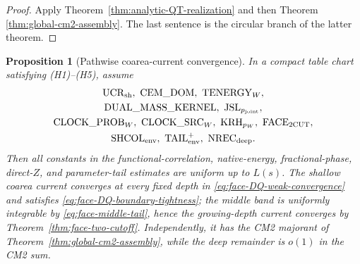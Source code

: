 \documentclass[11pt]{article}
\newtheorem{proposition}[theorem]{Proposition}
\begin{document}
\begin{proof}
Apply Theorem~\ref{thm:analytic-QT-realization} and then Theorem
\ref{thm:global-cm2-assembly}.  The last sentence is the circular branch of
the latter theorem.
\end{proof}

\begin{proposition}[Pathwise coarea-current convergence]
\label{prop:common-refinement-majorant}
In a compact table chart satisfying \textup{(H1)--(H5)}, assume
\[
\begin{gathered}
 \mathrm{UCR}_{\rm sh},\ \mathrm{CEM\_DOM},\ \mathrm{TENERGY}_{W},\\
 \mathrm{DUAL\_MASS\_KERNEL},\ \mathrm{JSL}_{p_{\rm joint}},\\
 \mathrm{CLOCK\_PROB}_{W},\ \mathrm{CLOCK\_SRC}_{W},\
 \mathrm{KRH}_{p_W},\ \mathrm{FACE}_{\rm 2CUT},\\
 \mathrm{SHCOL}_{\rm env},\ \mathrm{TAIL}_{\rm env}^{+},\
 \mathrm{NREC}_{\rm deep}.
\end{gathered}
\]
Then all constants in the
functional-correlation, native-energy, fractional-phase, direct-$Z$, and
parameter-tail estimates are uniform up to $L(s)$.  The shallow coarea current
converges at every fixed depth in
\eqref{eq:face-DQ-weak-convergence} and satisfies
\eqref{eq:face-DQ-boundary-tightness}; the middle band is uniformly
integrable by \eqref{eq:face-middle-tail}, hence the growing-depth current
converges by Theorem~\ref{thm:face-two-cutoff}.  Independently, it has the
CM2 majorant of Theorem~\ref{thm:global-cm2-assembly}, while the deep
remainder is $o(1)$ in the CM2 sum.
\end{proposition}
\end{document}
